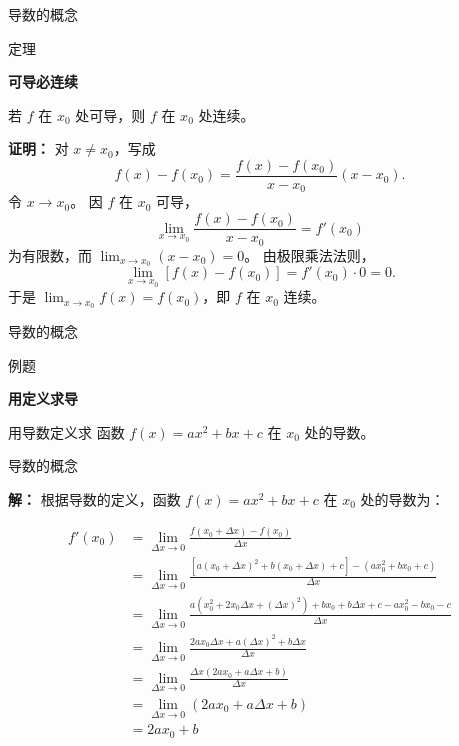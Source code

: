 \documentclass[aspectratio=169,10pt,fontset=fandol]{ctexbeamer}
\begin{document}
\begin{frame}[t,fragile]{导数的概念}
\normalsize
\begin{block}{定理}
{\normalsize
\textbf{可导必连续}\par

若 $f$ 在 $x_0$ 处可导，则 $f$ 在 $x_0$ 处连续。

}
\end{block}
\pause
{\normalsize
\textbf{证明：}
对 $x\neq x_0$，写成
\[
f(x)-f(x_0)=\frac{f(x)-f(x_0)}{x-x_0}(x-x_0).
\]
令 $x\to x_0$。 因 $f$ 在 $x_0$ 可导，
\[
\lim_{x\to x_0}\frac{f(x)-f(x_0)}{x-x_0}=f'(x_0)
\]
为有限数，而 $\lim_{x\to x_0}(x-x_0)=0$。 由极限乘法法则，
\[
\lim_{x\to x_0}[f(x)-f(x_0)]=f'(x_0)\cdot0=0.
\]
于是 $\lim_{x\to x_0}f(x)=f(x_0)$，即 $f$ 在 $x_0$ 连续。

}
\end{frame}
\begin{frame}[t,fragile]{导数的概念}
\footnotesize
\begin{block}{例题}
{\footnotesize
\textbf{用定义求导}\par

用导数定义求 函数 $f(x) = ax^2 + bx + c$ 在 $x_0$ 处的导数。

}
\end{block}
\end{frame}
\begin{frame}[t,fragile]{导数的概念}
\footnotesize
{\footnotesize
\textbf{解：}
根据导数的定义，函数 $f(x) = ax^2 + bx + c$ 在 $x_0$ 处的导数为：

\begin{align*}
	f'(x_0) &= \lim_{\Delta x \to 0} \frac{f(x_0 + \Delta x) - f(x_0)}{\Delta x} \\
	&= \lim_{\Delta x \to 0} \frac{[a(x_0 + \Delta x)^2 + b(x_0 + \Delta x) + c] - (ax_0^2 + bx_0 + c)}{\Delta x} \\
	&= \lim_{\Delta x \to 0} \frac{a(x_0^2 + 2x_0\Delta x + (\Delta x)^2) + bx_0 + b\Delta x + c - ax_0^2 - bx_0 - c}{\Delta x} \\
	&= \lim_{\Delta x \to 0} \frac{2ax_0\Delta x + a(\Delta x)^2 + b\Delta x}{\Delta x} \\
	&= \lim_{\Delta x \to 0} \frac{\Delta x(2ax_0 + a\Delta x + b)}{\Delta x} \\
	&= \lim_{\Delta x \to 0} (2ax_0 + a\Delta x + b) \\
	&= 2ax_0 + b
\end{align*}

}
\end{frame}
\end{document}
